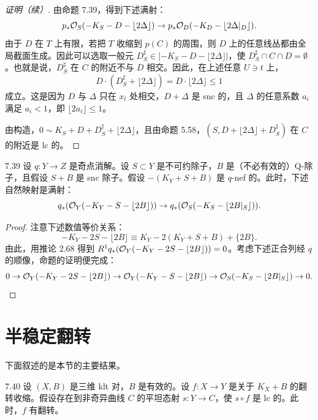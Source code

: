 \begin{proof}[证明（续）]
由命题 7.39，得到下述满射：
\[
p_*\mathcal{O}_S(-K_S-D-\lfloor 2\Delta\rfloor)\to p_*\mathcal{O}_D(-K_D-\lfloor 2\Delta|_D\rfloor).
\]
由于 $D$ 在 $T$ 上有限，若把 $T$ 收缩到 $p(C)$ 的周围，则 $D$ 上的任意线丛都由全局截面生成。因此可以选取一般元 $D^\sharp_S\in|-K_S-D-\lfloor 2\Delta\rfloor|$，使 $D^\sharp_S\cap C\cap D=\emptyset$。也就是说，$D^\sharp_S$ 在 $C$ 的附近不与 $D$ 相交。因此，在上述任意 $U\ni t$ 上，
\[
D\cdot(D^\sharp_S+\lfloor 2\Delta\rfloor)=D\cdot\lfloor 2\Delta\rfloor\le1
\]
成立。这是因为 $D$ 与 $\Delta$ 只在 $x_t$ 处相交，$D+\Delta$ 是 snc 的，且 $\Delta$ 的任意系数 $a_i$ 满足 $a_i<1$，即 $\lfloor 2a_i\rfloor\le1$。

由构造，$0\sim K_S+D+D^\sharp_S+\lfloor 2\Delta\rfloor$，且由命题 5.58，$(S,D+\lfloor 2\Delta\rfloor+D^\sharp_S)$ 在 $C$ 的附近是 lc 的。
\end{proof}

\begin{propositionp}{7.39}
设 $q\colon Y\to Z$ 是奇点消解。设 $S\subset Y$ 是不可约除子，$B$ 是（不必有效的）Q-除子，且假设 $S+B$ 是 snc 除子。假设 $-(K_Y+S+B)$ 是 $q$-nef 的。此时，下述自然映射是满射：
\[
q_*(\mathcal{O}_Y(-K_Y-S-\lfloor 2B\rfloor))\to q_*(\mathcal{O}_S(-K_S-\lfloor 2B|_S\rfloor)).
\]
\end{propositionp}

\begin{proof}
注意下述数值等价关系：
\[
-K_Y-2S-\lfloor 2B\rfloor\equiv K_Y-2(K_Y+S+B)+\{2B\}.
\]
由此，用推论 2.68 得到 $R^1q_*(\mathcal{O}_Y(-K_Y-2S-\lfloor 2B\rfloor))=0$。考虑下述正合列经 $q$ 的顺像，命题的证明便完成：
\[
0\to\mathcal{O}_Y(-K_Y-2S-\lfloor 2B\rfloor)\to\mathcal{O}_Y(-K_Y-S-\lfloor 2B\rfloor)\to\mathcal{O}_S(-K_S-\lfloor 2B|_S\rfloor)\to0.
\]
\end{proof}

\section{半稳定翻转}

下面叙述的是本节的主要结果。

\begin{theorem*}{7.40}
设 $(X,B)$ 是三维 klt 对，$B$ 是有效的。设 $f\colon X\to Y$ 是关于 $K_X+B$ 的翻转收缩。假设存在到非奇异曲线 $C$ 的平坦态射 $s\colon Y\to C$，使 $s\circ f$ 是 lc 的。此时，$f$ 有翻转。
\end{theorem*}

